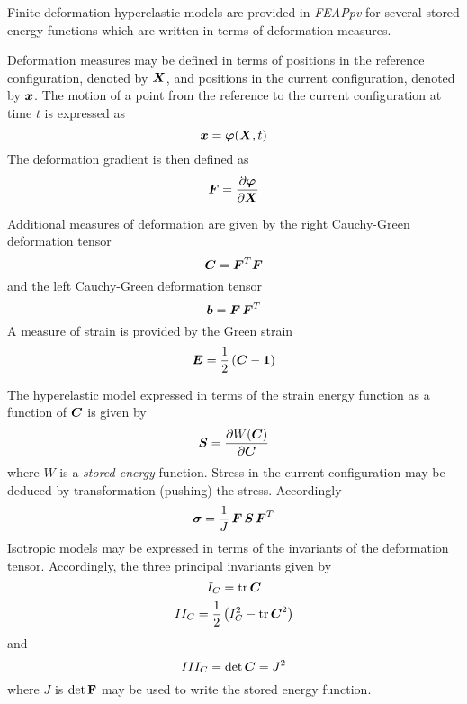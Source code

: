 Finite deformation hyperelastic models are provided in {\sl FEAPpv} for
several stored energy functions which are written in terms of deformation
measures.

Deformation measures may be defined in terms of positions in the reference
configuration, denoted by $\boldsymbol{X}$, and positions in the current
configuration, denoted by $\boldsymbol{x}$.  The motion of a point from the
reference to the current configuration at time $t$ is expressed as
\begin{equation}
\boldsymbol{x} = \boldsymbol{\varphi} ( \boldsymbol{X}, t )
\end{equation}
The deformation gradient is then defined as
\begin{equation}
\boldsymbol{F} = \frac{\partial \boldsymbol{\varphi}}{\partial \boldsymbol{X}}
\end{equation}

Additional measures of deformation are given by the right Cauchy-Green
deformation tensor
\begin{equation}
\boldsymbol{C} = \boldsymbol{F}^T \boldsymbol{F}
\end{equation}
and the left Cauchy-Green deformation tensor
\begin{equation}
\boldsymbol{b} = \boldsymbol{F} \, \boldsymbol{F}^T
\end{equation}
A measure of strain is provided by the Green strain
\begin{equation}
\boldsymbol{E} = \frac{1}{2} \left( \boldsymbol{C} - \boldsymbol{1} \right)
\end{equation}

The hyperelastic model expressed in terms of the strain energy function
as a function of $\boldsymbol{C}$ is given by
\begin{equation}
\boldsymbol{S} = \frac{\partial W(\boldsymbol{C})}{\partial \boldsymbol{C}}
\end{equation}
where $W$ is a {\it stored energy} function.
Stress in the current configuration may be deduced by transformation (pushing)
the stress.  Accordingly
\begin{equation}
\boldsymbol{\sigma} = \frac{1}{J} \, \boldsymbol{F} \, \boldsymbol{S} \, \boldsymbol{F}^T
\end{equation}
Isotropic models may be
expressed in terms of the invariants of the deformation tensor.  Accordingly,
the three principal invariants given by
\begin{equation}
I_C = {\rm tr} \, \boldsymbol{C}
\end{equation}
\begin{equation}
II_C = \frac{1}{2} \left( I_C^2 - {\rm tr} \, \boldsymbol{C}^2 \right)
\end{equation}
and
\begin{equation}
III_C = \det \boldsymbol{C} = J^2
\end{equation}
where $J$ is $\det \bf{F}$ may be used to write the stored energy function.


